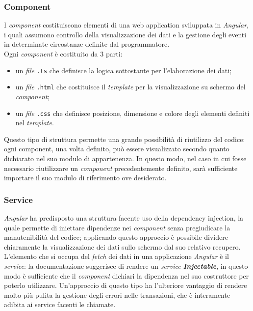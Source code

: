 \subsubsection{Component}\label{component}
I \textit{component} costituiscono elementi di una web application sviluppata in \textit{Angular}, i quali assumono controllo della visualizzazione dei dati e la gestione degli eventi in determinate circostanze definite dal programmatore.\\
Ogni \textit{component} è costituito da 3 parti:
\begin{itemize}
	\item un \textit{file} \texttt{.ts} che definisce la logica sottostante per l'elaborazione dei dati;
	\item un \textit{file} \texttt{.html} che costituisce il \textit{template} per la visualizzazione su schermo del \textit{component};
	\item un \textit{file} \texttt{.css} che definisce posizione, dimensione e colore degli elementi definiti nel \textit{template}.
\end{itemize} 
Questo tipo di struttura permette una grande possibilità di riutilizzo del codice: ogni component, una volta definito, può essere visualizzato secondo quanto dichiarato nel suo modulo di appartenenza. In questo modo, nel caso in cui fosse necessario riutilizzare un \textit{component} precedentemente definito, sarà sufficiente importare il suo modulo di riferimento ove desiderato.

\subsubsection{Service}\label{service}
\textit{Angular} ha predisposto una struttura facente uso della \gls{dependency injection}, la quale permette di iniettare dipendenze nei \textit{component} senza pregiudicare la manutenibilità del codice; applicando questo approccio è possibile dividere chiaramente la visualizzazione dei dati sullo schermo dal suo relativo recupero.\\
L'elemento che si occupa del \textit{fetch} dei dati in una applicazione \textit{Angular} è il \textit{service}: la documentazione suggerisce di rendere un \textit{service \textbf{Injectable}}, in questo modo è sufficiente che il \textit{component} dichiari la dipendenza nel suo costruttore per poterlo utilizzare.
Un'approccio di questo tipo ha l'ulteriore vantaggio di rendere molto più pulita la gestione degli errori nelle transazioni, che è interamente adibita ai service facenti le chiamate.

